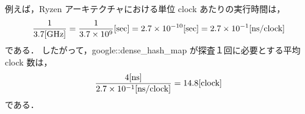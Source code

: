 例えば，Ryzen アーキテクチャにおける単位 clock あたりの実行時間は，
\begin{align*}
  \frac{1}{3.7 {\rm [GHz]}}
  = \frac{1}{3.7 \times 10^9}{\rm [sec]}
  = 2.7 \times 10^{-10}{\rm [sec]}
  = 2.7 \times 10^{-1}{\rm [ns/clock]}
\end{align*}
である．
したがって，google::dense\_hash\_map が探査１回に必要とする平均 clock 数は，
\begin{align*}
  \frac{ 4 {\rm [ns]} }{ 2.7 \times 10^{-1}{\rm [ns/clock]} }
  = 14.8 {\rm [clock]}
\end{align*}
である．















